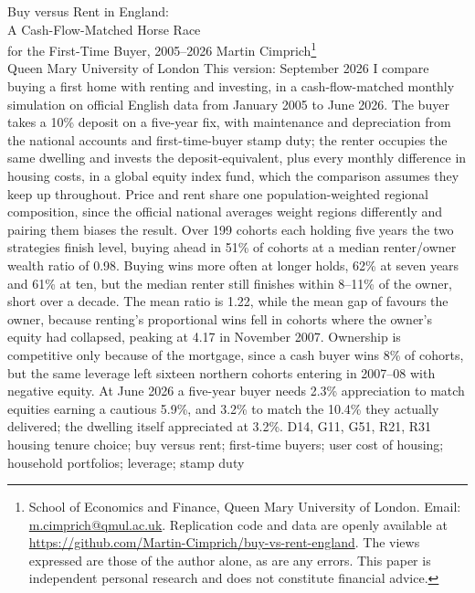 \documentclass[12pt, a4paper]{article}
\begin{document}
\wptitlepage
  {Buy versus Rent in England:\\ A Cash-Flow-Matched Horse Race\\ for the First-Time Buyer, 2005--2026}
  {Martin Cimprich\footnote{School of Economics and Finance, Queen Mary University of London. Email: \href{mailto:m.cimprich@qmul.ac.uk}{m.cimprich@qmul.ac.uk}. Replication code and data are openly available at \url{https://github.com/Martin-Cimprich/buy-vs-rent-england}. The views expressed are those of the author alone, as are any errors. This paper is independent personal research and does not constitute financial advice.}\\[1mm]
   \normalsize Queen Mary University of London}
  {This version: September 2026}
  {I compare buying a first home with renting and investing, in a cash-flow-matched monthly simulation on official English data from January 2005 to June 2026. The buyer takes a 10\% deposit on a five-year fix, with maintenance and depreciation from the national accounts and first-time-buyer stamp duty; the renter occupies the same dwelling and invests the deposit-equivalent, plus every monthly difference in housing costs, in a global equity index fund, which the comparison assumes they keep up throughout. Price and rent share one population-weighted regional composition, since the official national averages weight regions differently and pairing them biases the result. Over 199 cohorts each holding five years the two strategies finish level, buying ahead in 51\% of cohorts at a median renter/owner wealth ratio of 0.98. Buying wins more often at longer holds, 62\% at seven years and 61\% at ten, but the median renter still finishes within 8--11\% of the owner,  short over a decade. The mean ratio is 1.22, while the mean gap of  favours the owner, because renting's proportional wins fell in cohorts where the owner's equity had collapsed, peaking at 4.17 in November 2007. Ownership is competitive only because of the mortgage, since a cash buyer wins 8\% of cohorts, but the same leverage left sixteen northern cohorts entering in 2007--08 with negative equity. At June 2026 a five-year buyer needs 2.3\% appreciation to match equities earning a cautious 5.9\%, and 3.2\% to match the 10.4\% they actually delivered; the dwelling itself appreciated at 3.2\%.}
  {D14, G11, G51, R21, R31}
  {housing tenure choice; buy versus rent; first-time buyers; user cost of housing; household portfolios; leverage; stamp duty}
  {}











\newpage
\printbibliography[title={References}]

\newpage

\end{document}
